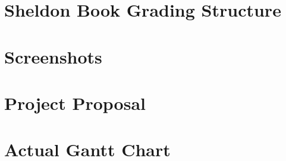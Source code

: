 \begin{appendices}

\chapter{Sheldon Book Grading Structure}





















\chapter{Screenshots}

\chapter{Project Proposal}

\chapter{Actual Gantt Chart}

\end{appendices}